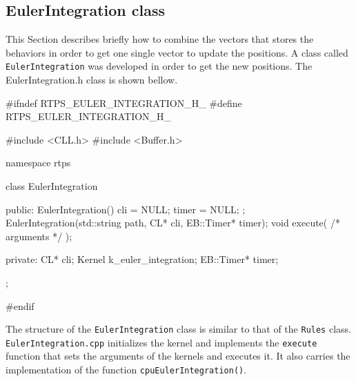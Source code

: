 



\subsection{EulerIntegration class}
This Section describes briefly how to combine the vectors that stores the behaviors in order to get one single vector to update the positions. A class called \texttt{EulerIntegration} was developed in order to get the new positions. The {EulerIntegration.h} class is shown bellow.

\begin{cppcode}{0}
#ifndef RTPS_EULER_INTEGRATION_H_
#define RTPS_EULER_INTEGRATION_H_

#include <CLL.h>
#include <Buffer.h>

namespace rtps
{
	class EulerIntegration
	{
		public:
			EulerIntegration() { cli = NULL; timer = NULL; };
	 		EulerIntegration(std::string path, CL* cli, EB::Timer* timer);
			void execute( /* arguments */ );

		private:
			CL* cli;
			Kernel k_euler_integration;
			EB::Timer* timer;
	};
}
#endif
\end{cppcode}

The structure of the \texttt{EulerIntegration} class is similar to that of the \texttt{Rules} class. \texttt{EulerIntegration.cpp} initializes the kernel and implements the \texttt{execute} function that sets the arguments of the kernels and executes it. It also carries the implementation of the function \texttt{cpuEulerIntegration()}. 

